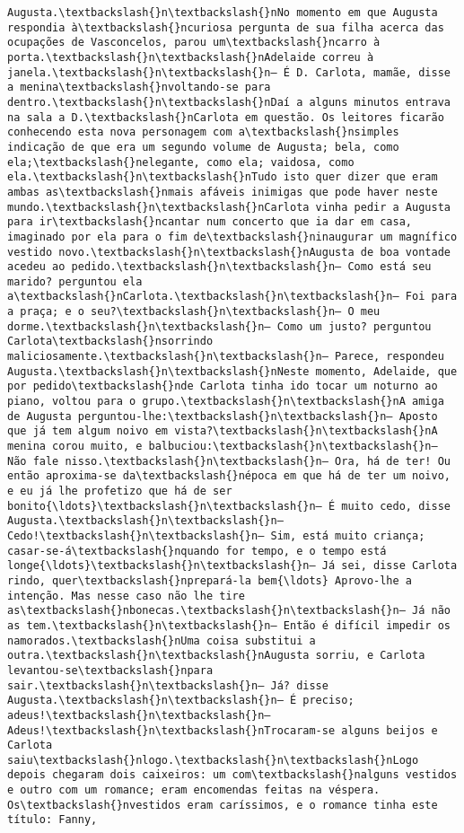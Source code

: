 \begin{Verbatim}[commandchars=\\\{\}]
Augusta.\textbackslash{}n\textbackslash{}nNo momento em que Augusta respondia à\textbackslash{}ncuriosa pergunta de sua filha acerca das ocupações de Vasconcelos, parou um\textbackslash{}ncarro à porta.\textbackslash{}n\textbackslash{}nAdelaide correu à janela.\textbackslash{}n\textbackslash{}n— É D. Carlota, mamãe, disse a menina\textbackslash{}nvoltando-se para dentro.\textbackslash{}n\textbackslash{}nDaí a alguns minutos entrava na sala a D.\textbackslash{}nCarlota em questão. Os leitores ficarão conhecendo esta nova personagem com a\textbackslash{}nsimples indicação de que era um segundo volume de Augusta; bela, como ela;\textbackslash{}nelegante, como ela; vaidosa, como ela.\textbackslash{}n\textbackslash{}nTudo isto quer dizer que eram ambas as\textbackslash{}nmais afáveis inimigas que pode haver neste mundo.\textbackslash{}n\textbackslash{}nCarlota vinha pedir a Augusta para ir\textbackslash{}ncantar num concerto que ia dar em casa, imaginado por ela para o fim de\textbackslash{}ninaugurar um magnífico vestido novo.\textbackslash{}n\textbackslash{}nAugusta de boa vontade acedeu ao pedido.\textbackslash{}n\textbackslash{}n— Como está seu marido? perguntou ela a\textbackslash{}nCarlota.\textbackslash{}n\textbackslash{}n— Foi para a praça; e o seu?\textbackslash{}n\textbackslash{}n— O meu dorme.\textbackslash{}n\textbackslash{}n— Como um justo? perguntou Carlota\textbackslash{}nsorrindo maliciosamente.\textbackslash{}n\textbackslash{}n— Parece, respondeu Augusta.\textbackslash{}n\textbackslash{}nNeste momento, Adelaide, que por pedido\textbackslash{}nde Carlota tinha ido tocar um noturno ao piano, voltou para o grupo.\textbackslash{}n\textbackslash{}nA amiga de Augusta perguntou-lhe:\textbackslash{}n\textbackslash{}n— Aposto que já tem algum noivo em vista?\textbackslash{}n\textbackslash{}nA menina corou muito, e balbuciou:\textbackslash{}n\textbackslash{}n— Não fale nisso.\textbackslash{}n\textbackslash{}n— Ora, há de ter! Ou então aproxima-se da\textbackslash{}népoca em que há de ter um noivo, e eu já lhe profetizo que há de ser bonito{\ldots}\textbackslash{}n\textbackslash{}n— É muito cedo, disse Augusta.\textbackslash{}n\textbackslash{}n— Cedo!\textbackslash{}n\textbackslash{}n— Sim, está muito criança; casar-se-á\textbackslash{}nquando for tempo, e o tempo está longe{\ldots}\textbackslash{}n\textbackslash{}n— Já sei, disse Carlota rindo, quer\textbackslash{}nprepará-la bem{\ldots} Aprovo-lhe a intenção. Mas nesse caso não lhe tire as\textbackslash{}nbonecas.\textbackslash{}n\textbackslash{}n— Já não as tem.\textbackslash{}n\textbackslash{}n— Então é difícil impedir os namorados.\textbackslash{}nUma coisa substitui a outra.\textbackslash{}n\textbackslash{}nAugusta sorriu, e Carlota levantou-se\textbackslash{}npara sair.\textbackslash{}n\textbackslash{}n— Já? disse Augusta.\textbackslash{}n\textbackslash{}n— É preciso; adeus!\textbackslash{}n\textbackslash{}n— Adeus!\textbackslash{}n\textbackslash{}nTrocaram-se alguns beijos e Carlota saiu\textbackslash{}nlogo.\textbackslash{}n\textbackslash{}nLogo depois chegaram dois caixeiros: um com\textbackslash{}nalguns vestidos e outro com um romance; eram encomendas feitas na véspera. Os\textbackslash{}nvestidos eram caríssimos, e o romance tinha este título: Fanny, 
\end{Verbatim}
